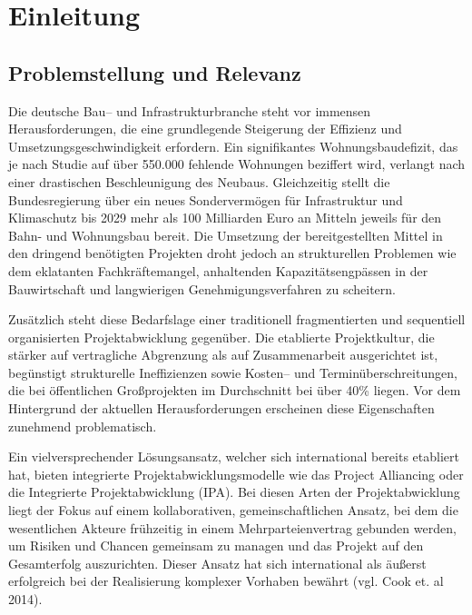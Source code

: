 \chapter{Einleitung}
\label{ch:einleitung}

\section{Problemstellung und Relevanz}
\label{sec:problemstellung}
Die deutsche Bau-- und Infrastrukturbranche steht vor immensen Herausforderungen, die  eine grundlegende Steigerung der Effizienz und Umsetzungsgeschwindigkeit erfordern.  Ein signifikantes Wohnungsbaudefizit, das je nach Studie auf über 550.000 fehlende  Wohnungen beziffert wird, verlangt nach einer drastischen Beschleunigung des Neubaus\autocite[]{pestel2025}. Gleichzeitig stellt die  Bundesregierung über ein neues Sondervermögen für Infrastruktur und Klimaschutz bis  2029 mehr als 100 Milliarden Euro an Mitteln jeweils für den Bahn- und Wohnungsbau  bereit\autocite[]{brinkmeier2025}. Die Umsetzung der bereitgestellten Mittel in den dringend  benötigten Projekten droht jedoch an strukturellen Problemen wie dem eklatanten  Fachkräftemangel, anhaltenden Kapazitätsengpässen in der Bauwirtschaft und  langwierigen Genehmigungsverfahren zu scheitern\autocite[]{hdb2025}.

Zusätzlich steht diese Bedarfslage einer traditionell fragmentierten und sequentiell  organisierten Projektabwicklung gegenüber. Die etablierte Projektkultur, die stärker auf  vertragliche Abgrenzung als auf Zusammenarbeit ausgerichtet ist, begünstigt strukturelle  Ineffizienzen sowie Kosten-- und Terminüberschreitungen, die bei öffentlichen  Großprojekten im Durchschnitt bei über 40\% liegen\autocite[]{korn2019}. Vor dem  Hintergrund der aktuellen Herausforderungen erscheinen diese Eigenschaften  zunehmend problematisch.

Ein vielversprechender Lösungsansatz, welcher sich international bereits etabliert hat,  bieten integrierte Projektabwicklungsmodelle wie das Project Alliancing oder die  Integrierte Projektabwicklung (IPA). Bei diesen Arten der Projektabwicklung liegt der  Fokus auf einem kollaborativen, gemeinschaftlichen Ansatz, bei dem die wesentlichen  Akteure frühzeitig in einem Mehrparteienvertrag gebunden werden, um Risiken und  Chancen gemeinsam zu managen und das Projekt auf den Gesamterfolg auszurichten.  Dieser Ansatz hat sich international als äußerst erfolgreich bei der Realisierung  komplexer Vorhaben bewährt (vgl. Cook et. al 2014).

